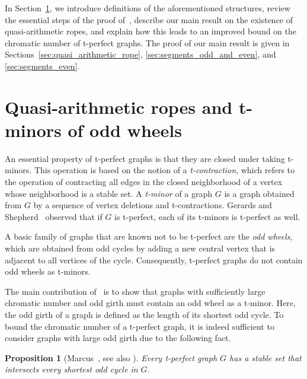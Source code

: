 \documentclass{article}
\newtheorem{proposition}[theorem]{Proposition}
\begin{document}
In Section~\ref{sec:basics}, we introduce definitions of the aforementioned structures, review the essential steps of the proof of~\cite{chudnovsky2024colouringtperfectgraphs}, describe our main result on the existence of quasi-arithmetic ropes, and explain how this leads to an improved bound on the chromatic number of t-perfect graphs.
The proof of our main result is given in Sections~\ref{sec:quasi_arithmetic_rope}, \ref{sec:segments_odd_and_even}, and \ref{sec:segments_even}.

\section{Quasi-arithmetic ropes and t-minors of odd wheels}
\label{sec:basics}

An essential property of t-perfect graphs is that they are closed under taking t-minors. 
This operation is based on the notion of a \emph{t-contraction}, which refers to the operation of contracting all edges in the closed neighborhood of a vertex whose neighborhood is a stable set.
A \emph{t-minor} of a graph $G$ is a graph obtained from $G$ by a sequence of vertex deletions and t-contractions.
Gerards and Shepherd~\cite{tminorstperfectgerards1998} observed that if $G$ is t-perfect, each of its t-minors is t-perfect as well.

A basic family of graphs that are known not to be t-perfect are the \emph{odd wheels}, which are obtained from odd cycles by adding a new central vertex that is adjacent to all vertices of the cycle.
Consequently, t-perfect graphs do not contain odd wheels as t-minors.

The main contribution of~\cite{chudnovsky2024colouringtperfectgraphs} is to show that graphs with sufficiently large chromatic number and odd girth must contain an odd wheel as a t-minor. Here, the odd girth of a graph is defined as the length of its shortest odd cycle. 
To bound the chromatic number of a t-perfect graph, it is indeed sufficient to consider graphs with large odd girth due to the following fact.

\begin{proposition}[{Marcus~\cite{marcus1996shortestoddcycles}, see also \cite[Lem.~3.4]{chudnovsky2024colouringtperfectgraphs}}]\label{prop:marcus}
    Every t-perfect graph $G$ has a stable set that intersects every shortest odd cycle in $G$.
\end{proposition}
\end{document}
